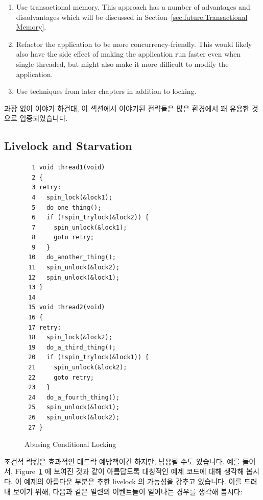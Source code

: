 {\begin{enumerate}
	\item	Use transactional memory.
		This approach has a number of advantages and disadvantages
		which will be discussed in
		Section~\ref{sec:future:Transactional Memory}.
	\item	Refactor the application to be more concurrency-friendly.
		This would likely also have the side effect of making
		the application run faster even when single-threaded, but might
		also make it more difficult to modify the application.
	\item	Use techniques from later chapters in addition to locking.
	\fi
	\end{enumerate}
} \QuickQuizEnd

과장 없이 이야기 하건대, 이 섹션에서 이야기된 전략들은 많은 환경에서 꽤 유용한
것으로 입증되었습니다.

\subsection{Livelock and Starvation}
\label{sec:locking:Livelock and Starvation}

\begin{figure}[tbp]
{ \scriptsize
\begin{verbatim}
  1 void thread1(void)
  2 {
  3 retry:
  4   spin_lock(&lock1);
  5   do_one_thing();
  6   if (!spin_trylock(&lock2)) {
  7     spin_unlock(&lock1);
  8     goto retry;
  9   }
 10   do_another_thing();
 11   spin_unlock(&lock2);
 12   spin_unlock(&lock1);
 13 }
 14 
 15 void thread2(void)
 16 {
 17 retry:
 18   spin_lock(&lock2);
 19   do_a_third_thing();
 20   if (!spin_trylock(&lock1)) {
 21     spin_unlock(&lock2);
 22     goto retry;
 23   }
 24   do_a_fourth_thing();
 25   spin_unlock(&lock1);
 26   spin_unlock(&lock2);
 27 }
\end{verbatim}
}
\caption{Abusing Conditional Locking}
\label{fig:locking:Abusing Conditional Locking}
\end{figure}

조건적 락킹은 효과적인 데드락 예방책이긴 하지만, 남용될 수도 있습니다.
예를 들어서, Figure~\ref{fig:locking:Abusing Conditional Locking} 에 보여진
것과 같이 아름답도록 대칭적인 예제 코드에 대해 생각해 봅시다.
이 예제의 아름다운 부분은 추한 livelock 의 가능성을 감추고 있습니다.
이를 드러내 보이기 위해, 다음과 같은 일련의 이벤트들이 일어나는 경우를 생각해
봅시다:
\iffalse


